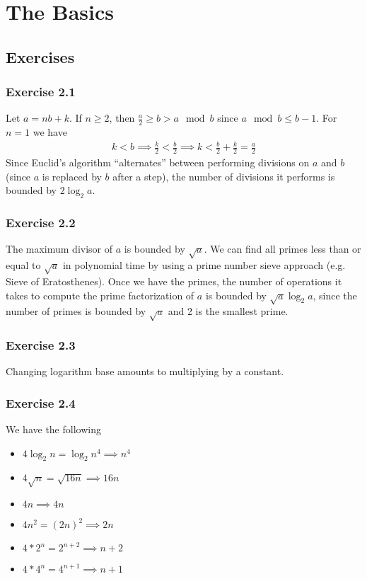 \section{The Basics}

\subsection{Exercises}

\subsubsection{Exercise 2.1}
Let $a = nb + k$. If $n \geq 2$, then $\frac{a}{2} \geq b > a \mod b$ since $a \mod b \leq b-1$. For $n = 1$
we have
\begin{align*}
        k < b \implies \frac{k}{2} < \frac{b}{2} \implies k < \frac{b}{2} + \frac{k}{2} = \frac{a}{2}
\end{align*}
Since Euclid's algorithm ``alternates'' between performing divisions on $a$ and $b$ (since $a$ is replaced
by $b$ after a step), the number of divisions it performs is bounded by $2\log_2 a$.

\subsubsection{Exercise 2.2}
The maximum divisor of $a$ is bounded by $\sqrt{a}$. We can find all primes less than or equal to $\sqrt{a}$ 
in polynomial time by using a prime number sieve approach (e.g. Sieve of Eratosthenes). Once we have
the primes, the number of operations it takes to compute the prime factorization of $a$ is bounded by
$\sqrt{a} \log_2 a$, since the number of primes is bounded by $\sqrt{a}$ and  2 is the smallest prime.

\subsubsection{Exercise 2.3}
Changing logarithm base amounts to multiplying by a constant.

\subsubsection{Exercise 2.4}
We have the following
\begin{itemize}
        \item $4\log_2 n = \log_2 n^4 \implies n^4$
        \item $4\sqrt{n} = \sqrt{16n} \implies 16n$
        \item $4n \implies 4n$ 
        \item $4n^2 = (2n)^2 \implies 2n$
        \item $4 * 2^n = 2^{n+2} \implies n + 2$ 
        \item $4 * 4^n = 4^{n+1} \implies  n + 1$
\end{itemize}

